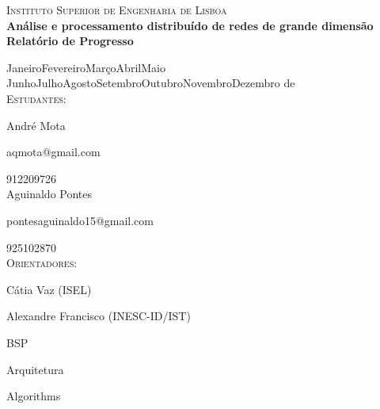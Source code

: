 \documentclass[a4paper,10pt]{report}
\begin{document}
\vskip0.5cm                
\begin{center}
  {\LARGE \textsc{Instituto Superior de Engenharia de Lisboa}}
  \\[1cm]
  {\huge \bf Análise e processamento distribuído de redes de grande dimensão}
  \\[0.5cm]
  {\large {\bf Relatório de Progresso}}
  
  {\large
    \ifcase\month\or Janeiro\or Fevereiro\or Mar\c{c}o\or Abril\or Maio\or
      Junho\or Julho\or Agosto\or Setembro\or Outubro\or Novembro\or Dezembro
    \fi
    \space de\space\the\year}
    \\[0.5cm]
    \textsc{Estudantes:}
    
    André Mota
    
    aqmota@gmail.com
    
    912209726
    \\[0.25cm]
    Aguinaldo Pontes
    
    pontesaguinaldo15@gmail.com
    
    925102870
    \\[0.5cm]
    \textsc{Orientadores:}
    
    Cátia Vaz (ISEL)
    
    Alexandre Francisco (INESC-ID/IST)

\end{center}


\tableofcontents




{BSP}

{Arquitetura}

{Algorithms}





\end{document}
